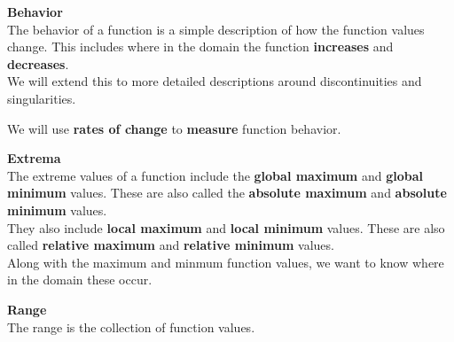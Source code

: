 \documentclass{ximera}
\begin{document}
\begin{definition}
\begin{explanation}  \textbf{\textcolor{blue!75!black}{Behavior}} \\

The behavior of a function is a simple description of how the function values change.  This includes where in the domain the function \textbf{\textcolor{purple!85!blue}{increases}} and \textbf{\textcolor{purple!85!blue}{decreases}}. \\


We will extend this to more detailed descriptions around discontinuities and singularities.


We will use \textbf{rates of change} to \textbf{measure} function behavior.

\end{explanation}









\begin{explanation}  \textbf{\textcolor{blue!75!black}{Extrema}} \\

The extreme values of a function include the \textbf{\textcolor{purple!85!blue}{global maximum}} and \textbf{\textcolor{purple!85!blue}{global minimum}} values. These are also called the \textbf{\textcolor{purple!85!blue}{absolute maximum}} and \textbf{\textcolor{purple!85!blue}{absolute minimum}} values.  \\

They also include \textbf{\textcolor{purple!85!blue}{local maximum}} and \textbf{\textcolor{purple!85!blue}{local minimum}} values. These are also called \textbf{\textcolor{purple!85!blue}{relative maximum}} and \textbf{\textcolor{purple!85!blue}{relative minimum}} values.  \\


Along with the maximum and minmum function values, we want to know where in the domain these occur.


\end{explanation}







\begin{explanation}  \textbf{\textcolor{blue!75!black}{Range}} \\

The range is the collection of function values. \\


\end{explanation}
\end{definition}
\end{document}
